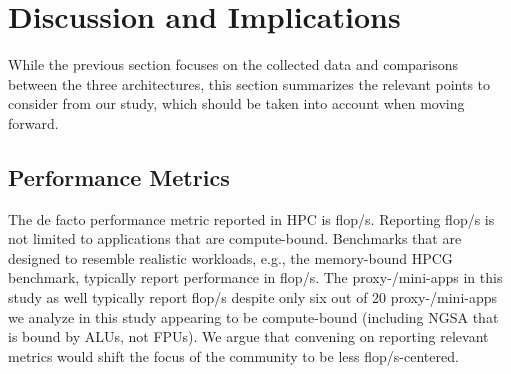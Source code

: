 \section{Discussion and Implications}\label{sec:discuss}
%
%

While the previous section focuses on the collected data and comparisons between
the three architectures, this section summarizes the relevant points to consider
from our study, which should be taken into account when moving forward.

\subsection{Performance Metrics}
The de facto performance metric reported in HPC is \unit[]{flop/s}. Reporting \unit[]{flop/s} is not limited to applications that are compute-bound. Benchmarks that are designed to resemble realistic workloads, e.g., the
memory-bound HPCG benchmark, typically report performance in \unit[]{flop/s}. The proxy-/mini-apps in this study as well typically report \unit[]{flop/s} despite only six out of 20 proxy-/mini-apps we analyze in this study appearing to be
compute-bound (including NGSA that is bound by ALUs, not FPUs). We
argue that convening on reporting relevant metrics would shift the focus of the community to be less \unit[]{flop/s}-centered.

